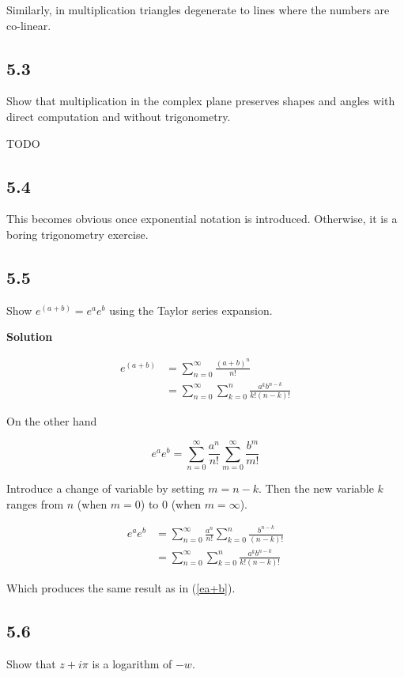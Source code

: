 \documentclass[]{article}
\begin{document}
Similarly, in multiplication triangles degenerate to lines where the numbers are co-linear.

\subsection*{5.3}
Show that multiplication in the complex plane preserves shapes and angles with direct computation and without trigonometry.

TODO

\subsection*{5.4}
This becomes obvious once exponential notation is introduced. Otherwise, it is a boring trigonometry exercise.

\subsection*{5.5}
Show $e^{(a+b)} = e^a e^b$ using the Taylor series expansion.

\textbf{Solution}

\begin{eqnarray}
e^{(a+b)} &= \sum_{n=0}^{\infty}\frac{(a+b)^n}{n!}\\
\label{ea+b}
&= \sum_{n=0}^{\infty}\sum_{k=0}^n \frac{a^k b^{n-k}}{k!(n-k)!}
\end{eqnarray}

On the other hand

\begin{equation}
e^a e^b = \sum_{n=0}^{\infty}\frac{a^n}{n!} \sum_{m=0}^{\infty}\frac{b^m}{m!}
\end{equation}

Introduce a change of variable by setting $m = n-k$. 
Then the new variable $k$ ranges from $n$ (when $m=0$) to $0$ (when $m=\infty$).

\begin{eqnarray}
e^a e^b &= \sum_{n=0}^{\infty}\frac{a^n}{n!} \sum_{k=0}^{n}\frac{b^{n-k}}{(n-k)!}\\
&= \sum_{n=0}^{\infty}\sum_{k=0}^n \frac{a^k b^{n-k}}{k!(n-k)!}
\end{eqnarray}

Which produces the same result as in (\ref{ea+b}).

\subsection*{5.6}
Show that $z+i\pi$ is a logarithm of $-w$.
\end{document}
